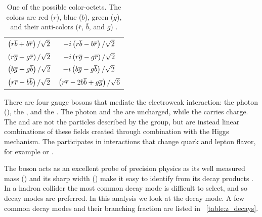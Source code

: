 \begin{table}[h]
\centering
{}
\begin{center}
    \begin{tabular}{c  c}
        $\left( r \overline{b} + b \overline{r} \right) / \sqrt{2}$ &
        $-i \left( r \overline{b} - b \overline{r} \right) / \sqrt{2}$ \\
        $\left( r \overline{g} + g \overline{r} \right) / \sqrt{2}$ &
        $-i \left( r \overline{g} - g \overline{r} \right) / \sqrt{2}$ \\
        $\left( b \overline{g} + g \overline{b} \right) / \sqrt{2}$ &
        $-i \left( b \overline{g} - g \overline{b} \right) / \sqrt{2}$ \\
        $\left( r \overline{r} - b \overline{b} \right) / \sqrt{2}$ &
        $\left( r \overline{r} - 2b \overline{b} + g \overline{g} \right) / \sqrt{6}$ \\
    \end{tabular}
    \caption[
        One possible QCD color-octet.
    ]{
        One of the possible color-octets. The colors are red ($r$), blue ($b$),
        green ($g$), and their anti-colors ($\overline{r}$, $\overline{b}$, and
        $\overline{g}$) .
    }
\label{table:gluon_color}
\end{center}
\end{table}

There are four gauge bosons that mediate the electroweak interaction: the photon
(\photon), the \Z, and the \Wpm. The photon and the \Z are uncharged, while the
\Wpm carries charge. The \W and \Z are not the particles described by the
\SUtwoUone group, but are instead linear combinations of these fields created
through combination with the Higgs mechanism. The \W participates in
interactions that change quark and lepton flavor, for example \ttoWb or
\mutoWnu.

The \Z boson acts as an excellent probe of precision physics as its well
measured mass (\Zmass) and its sharp width (\Zwidth) make it easy to identify
from its decay products \cite{pdg2014}. In a hadron collider the most common
\Ztoqq decay mode is difficult to select, and so \Ztoll decay modes are
preferred. In this analysis we look at the \Ztoee decay mode. A few common
decay modes and their branching fraction are listed in
\TAB~\ref{table:z_decays}.

